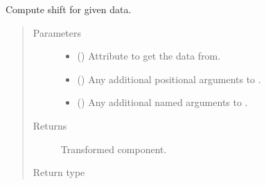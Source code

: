 \documentclass[letterpaper,10pt,english]{sphinxmanual}
\begin{document}
\begin{fulllineitems}
\begin{fulllineitems}
\label{\detokenize{api/base_classes:geology.src.base_spatial.SpatialComponent.shift}}
Compute shift for given data.
\begin{quote}\begin{description}
\item[{Parameters}] \leavevmode\begin{itemize}
\item {} 
 (\sphinxstyleliteralemphasis{\sphinxupquote{, }}) \textendash{} Attribute to get the data from.

\item {} 
 () \textendash{} Any additional positional arguments to .

\item {} 
 () \textendash{} Any additional named arguments to .

\end{itemize}

\item[{Returns}] \leavevmode
{} \textendash{} Transformed component.

\item[{Return type}] \leavevmode
{\hyperref[\detokenize{api/base_classes:geology.src.base_spatial.SpatialComponent}]{}}

\end{description}\end{quote}

\end{fulllineitems}



\end{fulllineitems}
\end{document}
